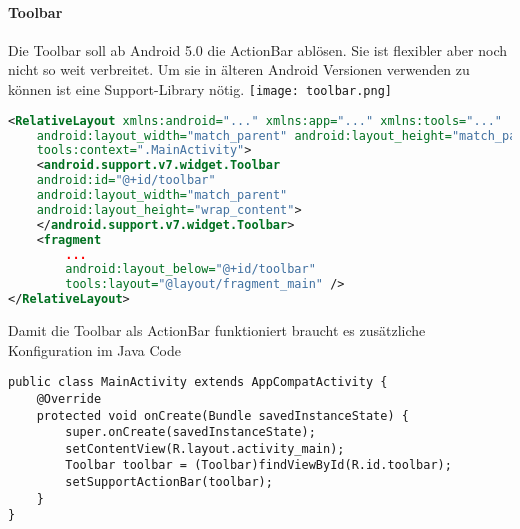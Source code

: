 \paragraph{Toolbar} Die Toolbar soll ab Android 5.0 die ActionBar ablösen. Sie ist flexibler aber noch nicht so weit verbreitet. Um sie in älteren Android Versionen verwenden zu können ist eine Support-Library nötig.
\texttt{[image: toolbar.png]}
\begin{lstlisting}[language=xml]
<RelativeLayout xmlns:android="..." xmlns:app="..." xmlns:tools="..."
    android:layout_width="match_parent" android:layout_height="match_parent"
    tools:context=".MainActivity">
    <android.support.v7.widget.Toolbar
    android:id="@+id/toolbar"
    android:layout_width="match_parent"
    android:layout_height="wrap_content">
    </android.support.v7.widget.Toolbar>
    <fragment
        ...
        android:layout_below="@+id/toolbar"
        tools:layout="@layout/fragment_main" />
</RelativeLayout>
\end{lstlisting}
Damit die Toolbar als ActionBar funktioniert braucht es zusätzliche Konfiguration im Java Code
\begin{lstlisting}
public class MainActivity extends AppCompatActivity {
    @Override
    protected void onCreate(Bundle savedInstanceState) {
        super.onCreate(savedInstanceState);
        setContentView(R.layout.activity_main);
        Toolbar toolbar = (Toolbar)findViewById(R.id.toolbar);
        setSupportActionBar(toolbar);
    }
}
\end{lstlisting}
